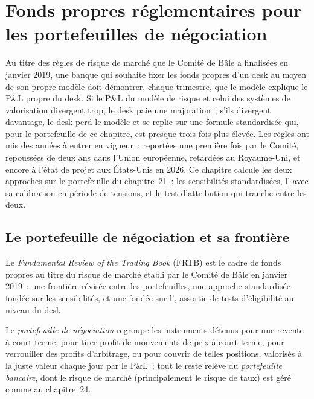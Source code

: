 \chapter{Fonds propres réglementaires pour les portefeuilles de négociation}\label{ch:rc:regulatory-capital-for-trading-books}

Au titre des règles de risque de marché que le Comité de Bâle a finalisées en janvier 2019, une banque qui
souhaite fixer les fonds propres d'un desk au moyen de son propre modèle doit démontrer, chaque trimestre,
que le modèle explique le P\&L propre du desk. Si le P\&L du modèle de risque et celui des systèmes de valorisation
divergent trop, le desk paie une majoration~; s'ils divergent davantage, le desk perd le modèle
et se replie sur une formule standardisée qui, pour le portefeuille de ce chapitre, est presque trois fois plus élevée.
Les règles ont mis des années à entrer en vigueur~: reportées une première fois par le Comité, repoussées de deux ans
dans l'Union européenne, retardées au Royaume-Uni, et encore à l'état de projet aux États-Unis en 2026. Ce chapitre
calcule les deux approches sur le portefeuille du chapitre~21~: les sensibilités standardisées,
l' avec sa calibration en période de tensions,
et le test d'attribution qui tranche entre les deux.

\section{Le portefeuille de négociation et sa frontière}

\begin{definition}\label{def:rc:regulatory-capital-for-trading-books:frtb}
Le \emph{Fundamental Review of the Trading Book}
(FRTB) est le cadre de fonds propres au titre du risque de marché établi par le Comité de Bâle en janvier 2019~: une frontière révisée
entre les portefeuilles, une approche standardisée fondée sur les sensibilités, et une 
fondée sur l', assortie de tests d'éligibilité au niveau du desk.
\end{definition}

\begin{definition}\label{def:rc:regulatory-capital-for-trading-books:books}
Le \emph{portefeuille de négociation} regroupe les instruments détenus pour une revente à court terme, pour
tirer profit de mouvements de prix à court terme, pour verrouiller des profits d'arbitrage, ou pour couvrir
de telles positions, valorisés à la juste valeur chaque jour par le P\&L~; tout le reste relève du \emph{portefeuille
bancaire}, dont le risque de marché (principalement le risque de taux) est géré comme au
chapitre~24.
\end{definition}

